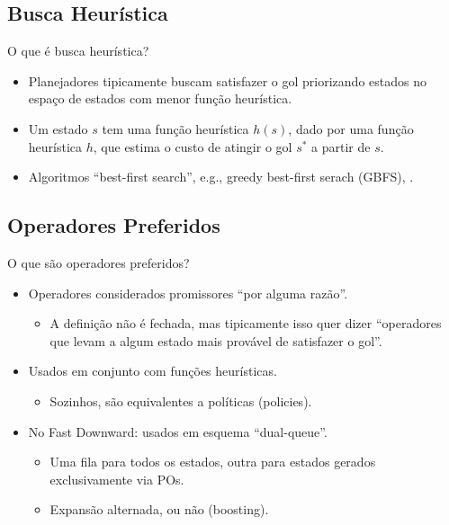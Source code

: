 \documentclass{beamer}
\begin{document}
\subsection{Busca Heurística}
\begin{frame}{O que é busca heurística?}
\begin{itemize}
  \item Planejadores tipicamente buscam satisfazer o gol \alert{priorizando} estados no espaço de estados com \alert{menor função heurística}.
  \pause
  \item Um estado $s$ tem uma função heurística $h(s)$, dado por uma função heurística $h$, que estima o \alert{custo de atingir o gol $s^{*}$} a partir de $s$.
  \pause
  \item Algoritmos ``best-first search'', e.g., greedy best-first serach (GBFS), \astar.
\end{itemize}
\end{frame}

\subsection{Operadores Preferidos}
\begin{frame}{O que são operadores preferidos?}
\begin{itemize}
\item \alert{Operadores} considerados \alert{promissores} ``por alguma razão''.
    \pause
  \begin{itemize}
  \item A definição não é fechada, mas tipicamente isso quer dizer ``operadores que levam a algum estado mais provável de satisfazer o gol''. %
  \end{itemize}
  \pause
\item Usados em conjunto com funções heurísticas.
  \begin{itemize}
  \item Sozinhos, são equivalentes a políticas (policies).
  \end{itemize}
\pause
\item No Fast Downward: usados em esquema ``\alert{dual-queue}''.
  \begin{itemize}
  \item Uma fila para todos os estados, outra para \alert{estados gerados exclusivamente via POs}.
  \item Expansão alternada, ou não (\alert{boosting}).
  \end{itemize}
\end{itemize}
\end{frame}
\end{document}
